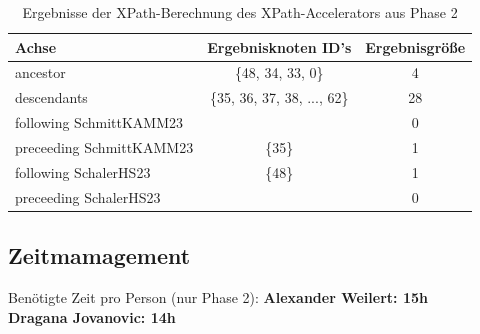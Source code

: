 \documentclass[11pt]{scrartcl}
\begin{document}
\begin{table}[h]
	\centering
		\begin{center}
			\begin{tabular}{ l | c c }
				\toprule
				Achse & Ergebnisknoten ID's & Ergebnisgröße\\
				\midrule
				ancestor & \{48, 34, 33, 0\} & 4 \\
				descendants & \{35, 36, 37, 38, ..., 62\} & 28 \\
				following SchmittKAMM23 & \emptyset & 0 \\
				preceeding SchmittKAMM23 & \{35\} & 1 \\
				following SchalerHS23 & \{48\} & 1 \\
				preceeding SchalerHS23 & \emptyset & 0 \\
				\bottomrule
			\end{tabular}
			\end{center}
	\caption{Ergebnisse der XPath-Berechnung des XPath-Accelerators aus Phase 2}
	\label{tab:ErgebnisseDerXPathBerechnug1}
\end{table}

\subsection*{Zeitmamagement}

Benötigte Zeit pro Person (nur Phase 2):
\textbf{Alexander Weilert: 15h} \\
\textbf{Dragana Jovanovic: 14h}
\end{document}
